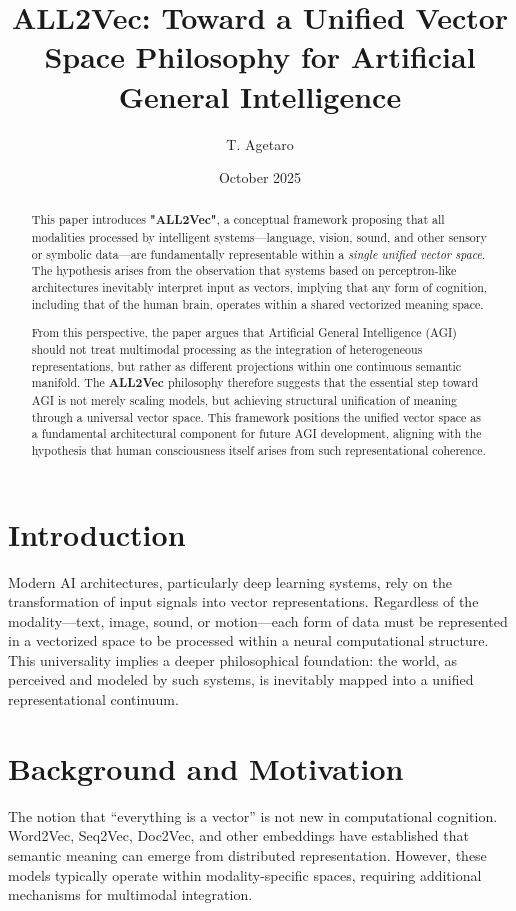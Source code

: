 \documentclass[11pt]{article}
\title{\textbf{ALL2Vec: Toward a Unified Vector Space Philosophy for Artificial General Intelligence}}
\author{T. Agetaro}
\affil{\textit{Independent Researcher, Japan} \\ \texttt{(contact available via GitHub Issues)}}
\date{October 2025}
\begin{document}
\maketitle

\begin{abstract}
This paper introduces \textbf{"ALL2Vec"}, a conceptual framework proposing that all modalities processed by intelligent systems---language, vision, sound, and other sensory or symbolic data---are fundamentally representable within a \textit{single unified vector space}. The hypothesis arises from the observation that systems based on perceptron-like architectures inevitably interpret input as vectors, implying that any form of cognition, including that of the human brain, operates within a shared vectorized meaning space.

From this perspective, the paper argues that Artificial General Intelligence (AGI) should not treat multimodal processing as the integration of heterogeneous representations, but rather as different projections within one continuous semantic manifold. The \textbf{ALL2Vec} philosophy therefore suggests that the essential step toward AGI is not merely scaling models, but achieving structural unification of meaning through a universal vector space. This framework positions the unified vector space as a fundamental architectural component for future AGI development, aligning with the hypothesis that human consciousness itself arises from such representational coherence.
\end{abstract}

\section{Introduction}
Modern AI architectures, particularly deep learning systems, rely on the transformation of input signals into vector representations. Regardless of the modality—text, image, sound, or motion—each form of data must be represented in a vectorized space to be processed within a neural computational structure. This universality implies a deeper philosophical foundation: the world, as perceived and modeled by such systems, is inevitably mapped into a unified representational continuum.

\section{Background and Motivation}
The notion that ``everything is a vector'' is not new in computational cognition. Word2Vec, Seq2Vec, Doc2Vec, and other embeddings have established that semantic meaning can emerge from distributed representation. However, these models typically operate within modality-specific spaces, requiring additional mechanisms for multimodal integration. 
\end{document}
